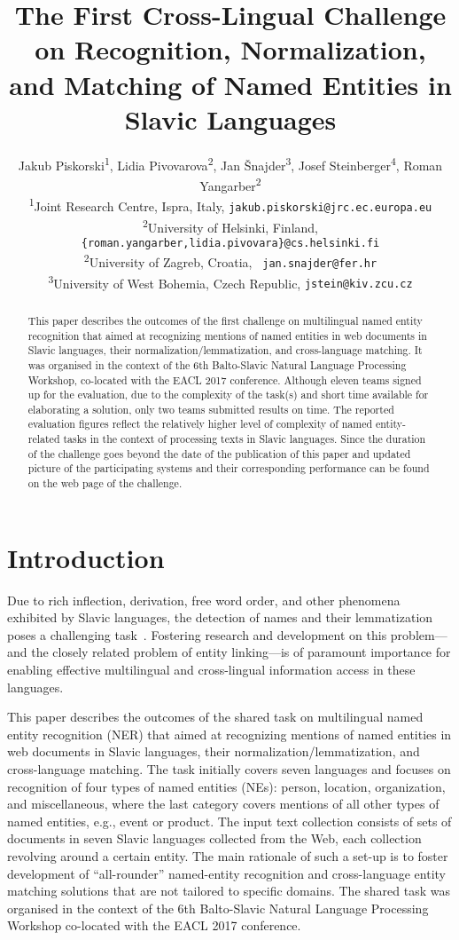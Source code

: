\documentclass[11pt]{article}
\title{The First Cross-Lingual Challenge on Recognition,
  Normalization,  
  \\ and Matching of Named Entities in Slavic Languages}
\author{Jakub Piskorski\textsuperscript{1},
  Lidia Pivovarova\textsuperscript{2},
  Jan Šnajder\textsuperscript{3},
  Josef Steinberger\textsuperscript{4},
  Roman Yangarber\textsuperscript{2} \\
  \textsuperscript{1}Joint Research Centre,
  \comment{Via Enrico Fermi 2749, 21027}Ispra\comment{ (VA)}, Italy,
  {\small \tt jakub.piskorski@jrc.ec.europa.eu} \\
  \textsuperscript{2}University of Helsinki, Finland, {\small \tt
  \{roman.yangarber,lidia.pivovara\}@cs.helsinki.fi}\\
    \textsuperscript{2}University of Zagreb, Croatia, {\small \tt
    jan.snajder@fer.hr} \\
  \textsuperscript{3}University of West Bohemia, Czech Republic, 
  {\small \tt jstein@kiv.zcu.cz} 
  }
\date{}
\begin{document}
\maketitle
\begin{abstract}

This paper describes the outcomes of the first challenge on multilingual named entity recognition 
that aimed at recognizing mentions of named entities in web documents in Slavic languages, 
their normalization/lemmatization, and cross-language matching. It was organised in 
the context of the 6th Balto-Slavic Natural Language Processing Workshop, co-located with the 
EACL 2017 conference. Although eleven teams signed up for the evaluation, due to the complexity
of the task(s) and short time available for elaborating a solution, only two teams submitted results
on time. The reported evaluation figures reflect the relatively higher level of complexity of 
named entity-related tasks in the context of processing texts in Slavic languages. Since the 
duration of the challenge goes beyond the date of the publication of this paper and updated
picture of the participating systems and their corresponding performance can be found on
the web page of the challenge.

\end{abstract}

\section{Introduction}
\label{sec:intro}

Due to rich inflection, derivation, free word order, and other phenomena
exhibited by Slavic languages, the detection of names and their
lemmatization poses a challenging
task~\cite{Przepiorkowski:2007:SIE:1567545.1567547,journals/ir/PiskorskiWS09}.
Fostering research and development on this problem---and the closely
related problem of entity linking---is of paramount importance for
enabling effective multilingual and cross-lingual information access in
these languages.

This paper describes the outcomes of the shared task on multilingual
named entity recognition {(NER)} that aimed at recognizing mentions
of named entities in web documents in Slavic languages, their
normalization/lemmatization, and cross-language matching.  The task
initially covers seven languages and focuses on recognition of four types
of named entities (NEs): person, location, organization, and
miscellaneous, where the last category covers mentions of all other types
of named entities, e.g., event or product.  The input text collection
consists of sets of documents in {seven Slavic languages} collected from
the Web, each collection revolving around a certain entity. The main
rationale of such a set-up is to foster development of ``all-rounder''
named-entity recognition and cross-language entity matching solutions
that are not tailored to specific domains.  The shared task was organised
in the context of the 6th Balto-Slavic Natural Language Processing
Workshop co-located with the EACL 2017 conference.
\end{document}

